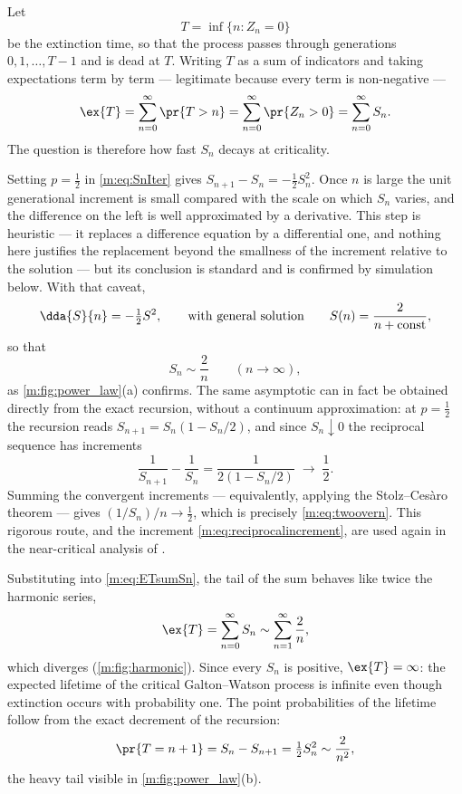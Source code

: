 Let
\begin{equation*}
T = \inf\{n : Z_n = 0\}
\end{equation*}
be the extinction time, so that the process passes through generations
$0,1,\dots,T-1$ and is dead at $T$. Writing $T$ as a sum of indicators and taking
expectations term by term --- legitimate because every term is non-negative ---
\begin{equation}
\label{m:eq:ETsumSn}
\ex{T} = \sum_{n=0}^{\infty}\pr{T>n} = \sum_{n=0}^{\infty}\pr{Z_n>0}
= \sum_{n=0}^{\infty}S_n .
\end{equation}
The question is therefore how fast $S_n$ decays at criticality.

Setting $p=\tfrac12$ in \cref{m:eq:SnIter} gives $S_{n+1}-S_n = -\tfrac12 S_n^2$.
Once $n$ is large the unit generational increment is small compared with the scale
on which $S_n$ varies, and the difference on the left is well approximated by a
derivative. This step is heuristic --- it replaces a difference equation by a
differential one, and nothing here justifies the replacement beyond the smallness
of the increment relative to the solution --- but its conclusion is standard and is
confirmed by simulation below. With that caveat,
\begin{equation*}
\dda{S}{n} = -\tfrac12 S^2,
\qquad\text{with general solution}\qquad
S(n) = \frac{2}{n+\text{const}},
\end{equation*}
so that
\begin{equation}
\label{m:eq:twoovern}
S_n \sim \frac{2}{n}\qquad(n\to\infty),
\end{equation}
as \cref{m:fig:power_law}(a) confirms. The same asymptotic can in fact be obtained
directly from the exact recursion, without a continuum approximation: at
$p=\tfrac12$ the recursion reads $S_{n+1}=S_n(1-S_n/2)$, and since $S_n\downarrow0$
the reciprocal sequence has increments
\begin{equation}
\label{m:eq:reciprocalincrement}
\frac{1}{S_{n+1}}-\frac{1}{S_n}
= \frac{1}{2(1-S_n/2)} \;\longrightarrow\; \frac12 .
\end{equation}
Summing the convergent increments --- equivalently, applying the Stolz--Ces\`aro
theorem --- gives $(1/S_n)/n\to\tfrac12$, which is precisely
\cref{m:eq:twoovern}. This rigorous route, and the increment
\cref{m:eq:reciprocalincrement}, are used again in the near-critical analysis of
\ChA.

Substituting into \cref{m:eq:ETsumSn}, the tail of the sum behaves like twice the
harmonic series,
\begin{equation*}
\ex{T} = \sum_{n=0}^{\infty}S_n \sim \sum_{n=1}^{\infty}\frac{2}{n},
\end{equation*}
which diverges (\cref{m:fig:harmonic}). Since every $S_n$ is positive,
$\ex{T}=\infty$: the expected lifetime of the critical Galton--Watson process is
infinite even though extinction occurs with probability one. The point
probabilities of the lifetime follow from the exact decrement of the recursion:
\begin{equation}
\label{m:eq:Ttail}
\pr{T=n+1} = S_n - S_{n+1} = \tfrac12S_n^2 \sim \frac{2}{n^2},
\end{equation}
the heavy tail visible in \cref{m:fig:power_law}(b).

